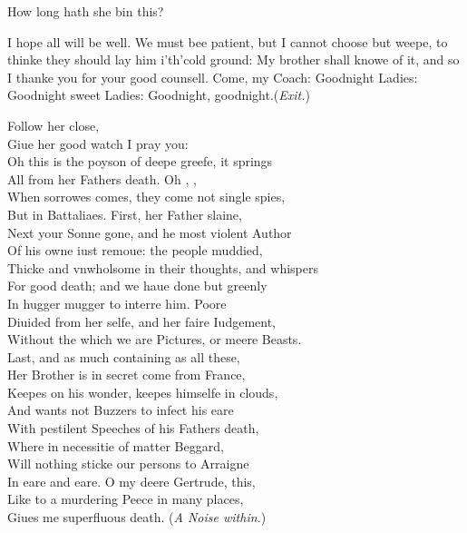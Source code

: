 \documentclass[a5paper,DIV=calc,11pt]{scrbook}
\begin{document}
\begin{drama*}
    \kingspeaks How long hath she bin this?
    
    \ophespeaks I hope all will be well. We must bee patient, but I cannot choose but weepe, to thinke they should lay him i'th'cold ground: My brother shall knowe of it, and so I thanke you for your good counsell. Come, my Coach: Goodnight Ladies: Goodnight sweet Ladies: Goodnight, goodnight.\hfill(\textit{Exit.})
    
    \kingspeaks Follow her close,\\
    Giue her good watch I pray you:\\
    Oh this is the poyson of deepe greefe, it springs\\
    All from her Fathers death. Oh \queen, \queen,\\
    When sorrowes comes, they come not single spies,\\
    But in Battaliaes. First, her Father slaine,\\
    Next your Sonne gone, and he most violent Author\\
    Of his owne iust remoue: the people muddied,\\
    Thicke and vnwholsome in their thoughts, and whispers\\
    For good \pol death; and we haue done but greenly\\
    In hugger mugger to interre him. Poore \ophe\\
    Diuided from her selfe, and her faire Iudgement,\\
    Without the which we are Pictures, or meere Beasts.\\
    Last, and as much containing as all these,\\
    Her Brother is in secret come from France,\\
    Keepes on his wonder, keepes himselfe in clouds,\\
    And wants not Buzzers to infect his eare\\
    With pestilent Speeches of his Fathers death,\\
    Where in necessitie of matter Beggard,\\
    Will nothing sticke our persons to Arraigne\\
    In eare and eare. O my deere Gertrude, this,\\
    Like to a murdering Peece in many places,\\
    Giues me superfluous death. \hfill(\textit{A Noise within.})
    
    

\end{drama*}
\end{document}
